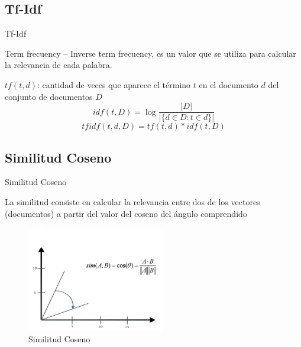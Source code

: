 \subsection{Tf-Idf}
\begin{frame}[fragile]{Tf-Idf}

Term frecuency – Inverse term frecuency, es un valor que se utiliza para calcular la relevancia de cada palabra.


\pause
$ tf(t,d) $: cantidad de veces que aparece el término $t$ en el documento $d$ del conjunto de documentos $D$ 
\begin{equation}
    idf(t,D) = \log{\frac{|D|}{|\{d\in{D}:t\in{d}\}|}}
\end{equation}
\begin{equation}
    tfidf(t,d,D) = tf(t,d)*idf(t,D)
\end{equation}


\end{frame}

\subsection{Similitud Coseno}
\begin{frame}{Similitud Coseno}

La similitud consiste en calcular la relevancia entre dos de los vectores (documentos) a partir del valor del coseno del ángulo comprendido
\pause

\begin{figure}[h]
    \center
    \includegraphics[width=6cm]{cosinesimilarity.png}
    \caption{Similitud Coseno}
\end{figure}

\end{frame}


